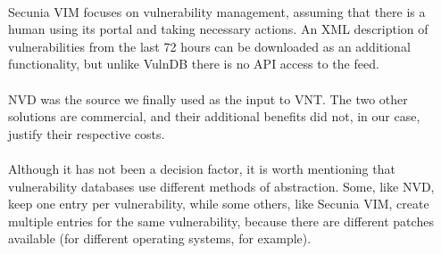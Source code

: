 \paragraph{}
Secunia VIM focuses on vulnerability management, assuming that there is a human using its portal and taking necessary actions. An XML description of vulnerabilities from the last 72 hours can be downloaded as an additional functionality, but unlike VulnDB there is no API access to the feed. 
\paragraph{}
NVD was the source we finally used as the input to VNT. The two other solutions are commercial, and their additional benefits did not, in our case, justify their respective costs. 
\paragraph{}
Although it has not been a decision factor, it is worth mentioning that vulnerability databases use different methods of abstraction. Some, like NVD, keep one entry per vulnerability, while some others, like Secunia VIM, create multiple entries for the same vulnerability, because there are different patches available (for different operating systems, for example).

